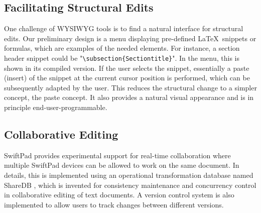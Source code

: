 \documentclass[]{sigchi}
\begin{document}
\subsection{Facilitating Structural Edits}
One challenge of WYSIWYG tools is to find a natural interface for structural edits.
Our preliminary design is a menu displaying pre-defined \LaTeX\ snippets or formulas, which are examples of the needed elements. For instance, a section header snippet could be "{\small \verb$\subsection{Sectiontitle}$}". In the menu, this is shown in its compiled version. If the user selects the snippet, essentially a paste (insert) of the snippet at the current cursor position is performed, which can be subsequently adapted by the user. This reduces the structural change to a simpler concept, the paste concept. It also provides a natural visual appearance and is in principle end-user-programmable.

\subsection{Collaborative Editing}
SwiftPad provides experimental support for real-time collaboration where multiple SwiftPad devices can be allowed to work on the same document. In details, this is implemented using an operational transformation database named ShareDB \cite{sharedb}, which is invented for consistency maintenance and concurrency control in collaborative editing of text documents. A version control system is also implemented to allow users to track changes between different versions. 
\end{document}

